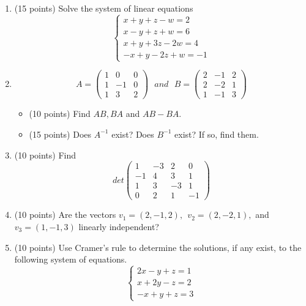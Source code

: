 \documentclass[fleqn]{article}
\begin{document}
  \begin{enumerate}
    \item (15 points) Solve the system of linear equations 
    $$
      \begin{cases}
        x+y+z-w=2
        \\
        x-y+z+w=6
        \\
        x+y+3z-2w=4
        \\
        -x+y-2z+w=-1
      \end{cases}
    $$

    \item 
    $$
      A=\begin{pmatrix}
        1 & 0 & 0
        \\
        1 & -1 & 0
        \\
        1 & 3 & 2
      \end{pmatrix} ~~~
      and ~~~
      B=\begin{pmatrix}
        2 & -1 & 2
        \\
        2 & -2 & 1
        \\
        1 & -1 & 3
      \end{pmatrix}
    $$
    
      \begin{itemize}
        \item (10 points) Find $AB, BA$ and $AB-BA$.
        \item (15 points) Does $A^{-1}$ exist? Does $B^{-1}$ exist? If so, find them.
      \end{itemize}

    \item (10 points) Find
    $$
      det \begin{pmatrix}
        1 & -3 & 2 & 0
        \\
        -1 & 4 & 3 & 1
        \\
        1 & 3 & -3 & 1
        \\
        0 & 2 & 1 & -1
      \end{pmatrix}
    $$

    \item (10 points) Are the vectors $v_1=(2, -1, 2), ~~ v_2=(2, -2, 1),$ and $v_3=(1, -1, 3)$ linearly independent?

    \item (10 points) Use Cramer’s rule to determine the solutions, if any exist, to the following system
    of equations.
    $$
      \begin{cases}
        2x-y+z=1
        \\
        x+2y-z=2
        \\
        -x+y+z=3
      \end{cases}
    $$
    


\end{enumerate}
\end{document}
